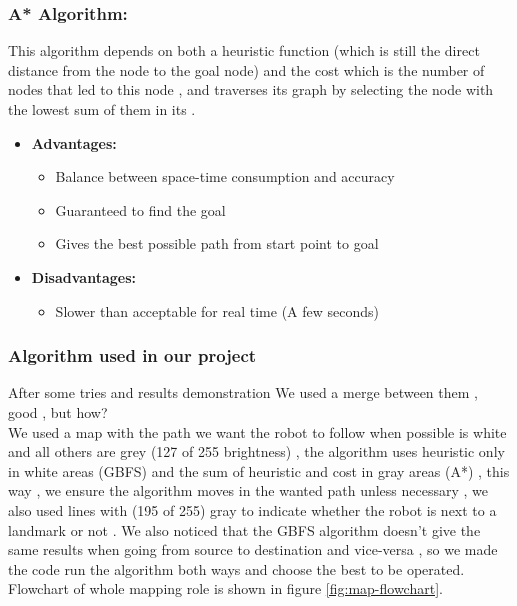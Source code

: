 \documentclass[12pt]{article}
\begin{document}
\subsubsection{A* Algorithm:}
This algorithm depends on both a heuristic function (which is still the direct distance from the node to the goal node) and the cost which is the number of nodes that led to this node , and traverses its graph by selecting the node with the lowest sum of them in its .

\begin{itemize}
	\item \textbf{Advantages:}
	\begin{itemize}
		\item Balance between space-time consumption and accuracy
		\item Guaranteed to find the goal
		\item Gives the best possible path from start point to goal
		
		
	\end{itemize}
	\item \textbf{Disadvantages:}
	\begin{itemize}
		\item Slower than acceptable for real time (A few seconds)
		
	\end{itemize}
\end{itemize}

\subsubsection{Algorithm used in our project}
After some tries and results demonstration We used a merge between them , good , but how?\\
We used a map with the path we want the robot to follow when possible is white and all others are grey (127 of 255 brightness) , the algorithm uses heuristic only in white areas (GBFS) and the sum of heuristic and cost in gray areas (A*) , this way , we ensure the algorithm moves in the wanted path unless necessary , we also used lines with (195 of 255) gray to indicate whether the robot is next to a landmark or not .
We also noticed that the GBFS algorithm doesn’t give the same results when going from source to destination and vice-versa , so we made the code run the algorithm both ways and choose the best to be operated.
Flowchart of whole mapping role is shown in figure \ref{fig:map-flowchart}.
\end{document}
